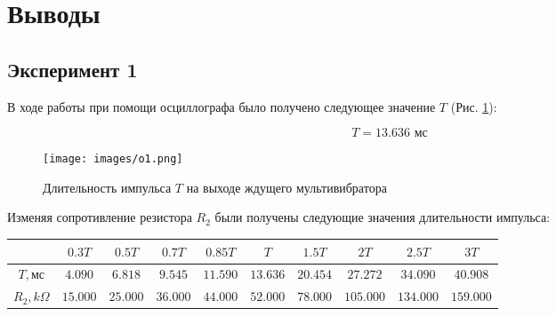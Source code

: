 \documentclass[12pt]{article}
\begin{document}
    \newpage

    \section*{Выводы}

    \subsection*{Эксперимент 1}

    В ходе работы при помощи осциллографа было получено следующее значение $T$ (Рис. \ref{fig:o:1}):

    $$ T = 13.636 \text{ мс} $$

    \begin{figure}[ht]
        \centering
        \texttt{[image: images/o1.png]}
        \caption{Длительность импульса $T$ на выходе ждущего мультивибратора}
        \label{fig:o:1}
    \end{figure}

    \newpage

    Изменяя сопротивление резистора $R_2$ были получены следующие значения длительности импульса:

    \begin{table}[ht]
        \centering
        \begin{tabular}{|c|c|c|c|c|c|c|c|c|c|}
            \hline
            & $0.3T$ & $0.5T$ & $0.7T$ & $0.85T$ & $T$ & $1.5T$ & $2T$ & $2.5T$ & $3T$ \\
            \hline
            $T, \text{мс}$ & $4.090$ & $6.818$ & $9.545$ & $11.590$ & $13.636$ & $20.454$ & $27.272$ & $34.090$ & $40.908$ \\
            \hline
            $R_2, k\Omega$ & $15.000$ & $25.000$ & $36.000$ & $44.000$ & $52.000$ & $78.000$ & $105.000$ & $134.000$ & $159.000$ \\
            \hline
        \end{tabular}
    \end{table}

    \begin{figure}[ht]
        \centering
    \end{figure}
\end{document}
